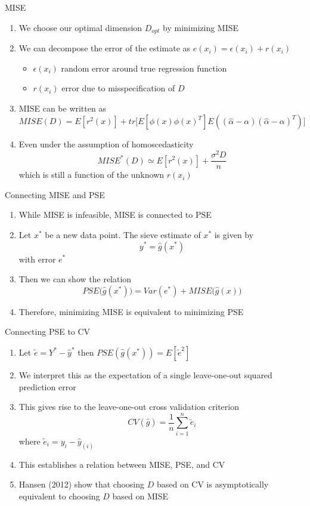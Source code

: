 \documentclass{beamer}
\begin{document}
\begin{frame}{MISE}%
\begin{enumerate}
\item We choose our optimal dimension $D_{opt}$ by minimizing MISE 
\item We can decompose the error of the estimate as $e(x_i) = \epsilon(x_i) + r(x_i)$
\begin{itemize}
  \item $\epsilon(x_i)$ random error around true regression function
  \item $r(x_i)$ error due to misspecification of $D$ 
\end{itemize}\pause
\item MISE can be written as $$MISE(D) = E[r^{2}(x)] + tr\Big[E[\phi(x)\phi(x)^{T}]E\left((\hat{\alpha} - \alpha)(\hat{\alpha} - \alpha)^{T}\right)\Big]$$
\item Even under the assumption of homoscedasticity $$MISE^*(D)\simeq E[r^2(x)] + \frac{\sigma^2 D}{n}$$
which is still a function of the unknown $r(x_i)$
\end{enumerate}
\end{frame}

\begin{frame}{Connecting MISE and PSE}%
\begin{enumerate}
\item While MISE is infeasible, MISE is connected to PSE 
\item Let $x^{*}$ be a new data point. The sieve estimate of $x^{*}$ is given by $$y^{*} = \hat{g}(x^{*})$$ with error $e^{*}$
\item Then we can show the relation $$PSE\Big(\hat{g}(x^{*})\Big) = Var(e^{*}) + MISE\Big(\hat{g}(x)\Big)$$
\item Therefore, minimizing MISE is equivalent to minimizing PSE
\end{enumerate}
\end{frame}
\begin{frame}{Connecting PSE to CV}%
\begin{enumerate}
\item Let $\tilde{e} = Y^{*} - \hat{y}^{*}$ then $PSE(\hat{g}(x^{*}))= E[\tilde{e}^2]$
\item We interpret this as the expectation of a single leave-one-out squared prediction error\pause
\item This gives rise to the leave-one-out cross validation criterion $$CV(\hat{g}) = \frac{1}{n}\sum_{i=1}^n\tilde{e}_{i}$$ where $\tilde{e}_i = y_i - \hat{y}_{(i)}$
\item This establishes a relation between MISE, PSE, and CV \pause 
\item Hansen (2012) show that choosing $D$ based on CV is asymptotically equivalent to choosing $D$ based on MISE
\end{enumerate}
\end{frame}
\end{document}

